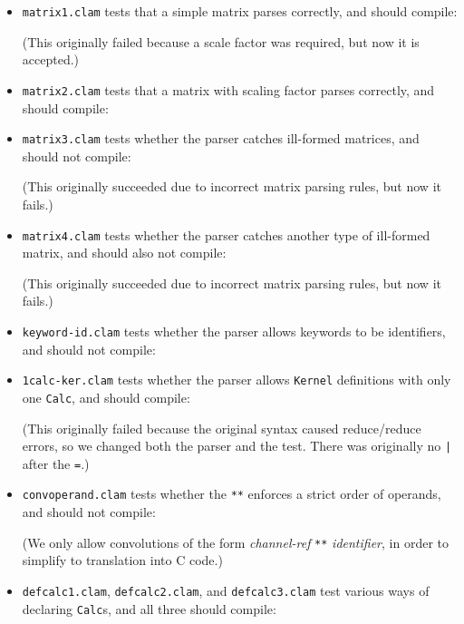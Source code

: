 \begin{itemize}

\item \texttt{matrix1.clam} tests that a simple matrix parses correctly, and should compile:

(This originally failed because a scale factor was required, but now it is accepted.)

\item \texttt{matrix2.clam} tests that a matrix with scaling factor parses correctly, and should compile:


\item \texttt{matrix3.clam} tests whether the parser catches ill-formed matrices, and should not compile:

(This originally succeeded due to incorrect matrix parsing rules, but now it fails.)

\item \texttt{matrix4.clam} tests whether the parser catches another type of ill-formed matrix, and should also not compile:

(This originally succeeded due to incorrect matrix parsing rules, but now it fails.)

\item \texttt{keyword-id.clam} tests whether the parser allows keywords to be identifiers, and should not compile:


\item \texttt{1calc-ker.clam} tests whether the parser allows \texttt{Kernel} definitions with only one \texttt{Calc}, and should compile:

(This originally failed because the original syntax caused reduce/reduce errors, so we changed both the parser and the test.
There was originally no \texttt{|} after the \texttt{=}.)

\item \texttt{convoperand.clam} tests whether the \texttt{**} enforces a strict order of operands, and should not compile:

(We only allow convolutions of the form \emph{channel-ref} \texttt{**} \emph{identifier}, in order to simplify
to translation into C code.)

\item \texttt{defcalc1.clam}, \texttt{defcalc2.clam}, and \texttt{defcalc3.clam} test various ways of declaring \texttt{Calc}s,
and all three should compile:





\end{itemize}

